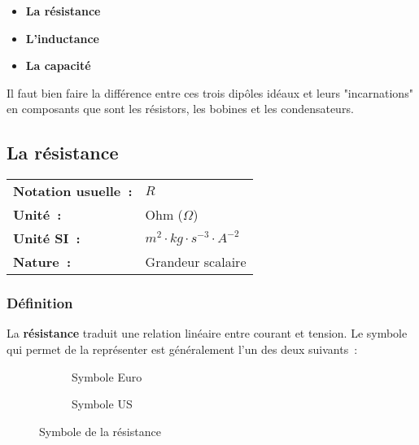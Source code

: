 \begin{itemize}
\item \textbf{La résistance}
\item \textbf{L'inductance}
\item \textbf{La capacité} \\
\end{itemize}

Il faut bien faire la différence entre ces trois dipôles idéaux et leurs "incarnations" en composants que sont les résistors, les bobines et les condensateurs. \\

\subsection{ La résistance }

\vspace{0.5cm}
\begin{tabular}{ll}
\textbf{Notation usuelle~:} & $R$ \\
\textbf{Unité~:} & Ohm ($\Omega$) \\
\textbf{Unité SI~:} & $m^2 \cdot kg \cdot {s}^{-3} \cdot A^{-2}$ \\
\textbf{Nature~:} & Grandeur scalaire \\
\end{tabular} 

\subsubsection*{Définition}

La \textbf{résistance} traduit une relation linéaire entre courant et tension. Le symbole qui permet de la représenter est généralement l'un des deux suivants~:

\begin{figure}[!h]
\centering
\begin{subfigure}{.4\textwidth}
\centering
	
\caption{Symbole Euro}
\end{subfigure}%
\begin{subfigure}{.4\textwidth}
\centering
	 
\caption{Symbole US}
\end{subfigure}
\caption{Symbole de la résistance}
\end{figure}

